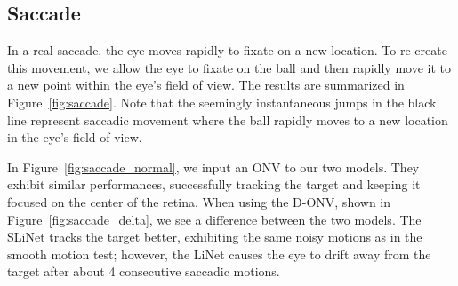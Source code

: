 \documentclass [MS] {UCLAthesis}
\begin{document}
\subsection{Saccade}

In a real saccade, the eye moves rapidly to fixate on a new location. To re-create this movement, we allow the eye to fixate on the ball and then rapidly move it to a new point within the eye's field of view. The results are summarized in Figure~\ref{fig:saccade}. Note that the seemingly instantaneous jumps in the black line represent saccadic movement where the ball rapidly moves to a new location in the eye's field of view.

In Figure~\ref{fig:saccade_normal}, we input an ONV to our two models. They exhibit similar performances, successfully tracking the target and keeping it focused on the center of the retina. When using the D-ONV, shown in Figure~\ref{fig:saccade_delta}, we see a difference between the two models. The SLiNet tracks the target better, exhibiting the same noisy motions as in the smooth motion test; however, the LiNet causes the eye to drift away from the target after about 4 consecutive saccadic motions. 
\end{document}
